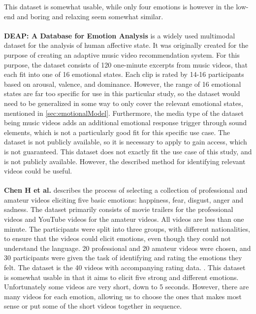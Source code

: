 This dataset is somewhat usable, while only four emotions is however in the low-end and boring and relaxing seem somewhat similar.
\\ \\
\textbf{DEAP: A Database for Emotion Analysis} is a widely used multimodal dataset for the analysis of human affective state. It was originally created for the purpose of creating an adaptive music video recommendation system. For this purpose, the dataset consists of 120 one-minute excerpts from music videos, that each fit into one of 16 emotional states. Each clip is rated by 14-16 participants based on arousal, valence, and dominance. However, the range of 16 emotional states are far too specific for use in this particular study, so the dataset would need to be generalized in some way to only cover the relevant emotional states, mentioned in \cref{sec:emotionalModel}.
Furthermore, the media type of the dataset being music videos adds an additional emotional response trigger through sound elements, which is not a particularly good fit for this specific use case. The dataset is not publicly available, so it is necessary to apply to gain access, which is not guaranteed. \cite{DEAP} \newline
This dataset does not exactly fit the use case of this study, and is not publicly available. However, the described method for identifying relevant videos could be useful. 
\\ \\
\textbf{Chen H et al.} describes the process of selecting a collection of professional and amateur videos eliciting five basic emotions: happiness, fear, disgust, anger and sadness. The dataset primarily consists of movie trailers for the professional videos and YouTube videos for the amateur videos. All videos are less than one minute.
The participants were split into three groups, with different nationalities, to ensure that the videos could elicit emotions, even though they could not understand the language. 20 professional and 20 amateur videos were chosen, and 30 participants were given the task of identifying and rating the emotions they felt. The dataset is the 40 videos with accompanying rating data. \cite{CHEN2021106662}.
This dataset is somewhat usable in that it aims to elicit five strong and different emotions. Unfortunately some videos are very short, down to 5 seconds. However, there are many videos for each emotion, allowing us to choose the ones that makes most sense or put some of the short videos together in sequence.

